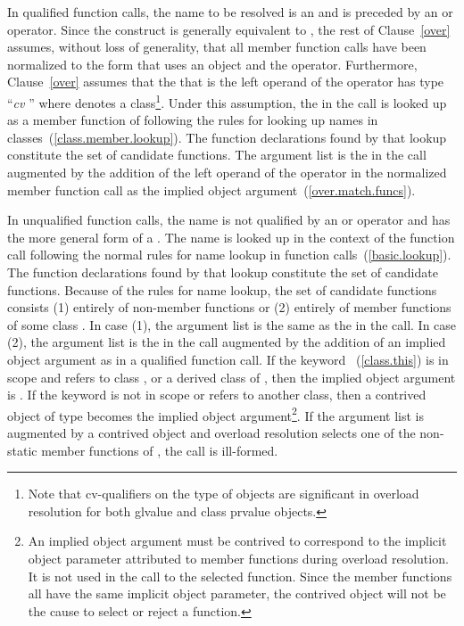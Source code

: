 \pnum
In qualified function calls, the name to be resolved is an
and is preceded by an
\tcode{->}
or
operator.
Since the
construct
is generally equivalent to
,
the rest of
Clause~\ref{over} assumes, without loss of generality, that all member
function calls have been normalized to the form that uses an
object and the
operator.
Furthermore, Clause~\ref{over} assumes that
the
that is the left operand of the
operator
has type ``\textit{cv}
''
where
denotes a class\footnote{Note that cv-qualifiers on the type of objects are
significant in overload
resolution for
both glvalue and class prvalue objects.}.
Under this
assumption, the
in the call is looked up as a
member function of
following the rules for looking up names in
classes~(\ref{class.member.lookup}).
The function declarations found by that lookup constitute the set of
candidate functions.
The argument list is the
in the call augmented by the addition of the left operand of
the
operator in the normalized member function call as the
implied object argument~(\ref{over.match.funcs}).

\pnum
In unqualified function calls, the name is not qualified by an
\tcode{->}
or
operator and has the more general form of a
.
The name is looked up in the context of the function
call following the normal rules for name lookup in function
calls~(\ref{basic.lookup}).
The function declarations found by that lookup constitute the
set of candidate functions.
Because of the rules for name lookup, the set of candidate functions
consists (1) entirely of non-member functions or (2) entirely of
member functions of some class
.
In case (1),
the argument list is
the same as the
in the call.
In case (2), the argument list is the
in the call augmented by the addition of an implied object
argument as in a qualified function call.
If the keyword
~(\ref{class.this}) is in scope and refers to
class
,
or a derived class of
,
then the implied object argument is
.
If the keyword
is not in
scope or refers to another class, then
a contrived object of type
becomes the implied object
argument\footnote{An implied object argument must be contrived to
correspond to the implicit object
parameter attributed to member functions during overload resolution.
It is not
used in
the call to the selected function.
Since the member functions all have the
same implicit
object parameter, the contrived object will not be the cause to select or
reject a
function.}.
If the argument list is augmented by a contrived object and overload
resolution selects one of the non-static member functions of
,
the call is ill-formed.

